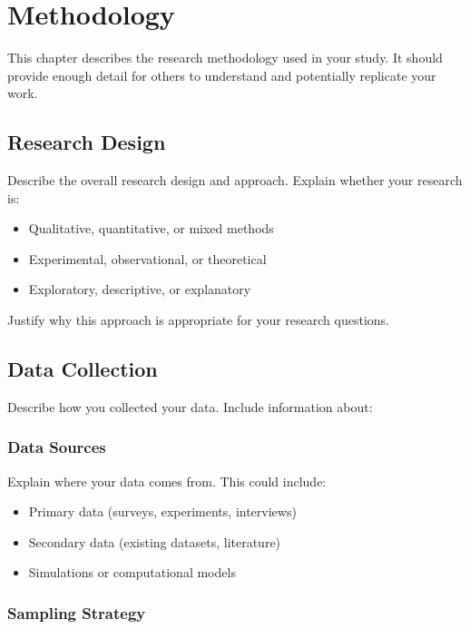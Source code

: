 
\chapter{Methodology}
\label{methodology}
\thispagestyle{empty}


This chapter describes the research methodology used in your study. It should provide enough detail for others to understand and potentially replicate your work.

\section{Research Design}

Describe the overall research design and approach. Explain whether your research is:
\begin{itemize}
    \item Qualitative, quantitative, or mixed methods
    \item Experimental, observational, or theoretical
    \item Exploratory, descriptive, or explanatory
\end{itemize}

Justify why this approach is appropriate for your research questions.

\section{Data Collection}

Describe how you collected your data. Include information about:

\subsection{Data Sources}

Explain where your data comes from. This could include:
\begin{itemize}
    \item Primary data (surveys, experiments, interviews)
    \item Secondary data (existing datasets, literature)
    \item Simulations or computational models
\end{itemize}

\subsection{Sampling Strategy}

